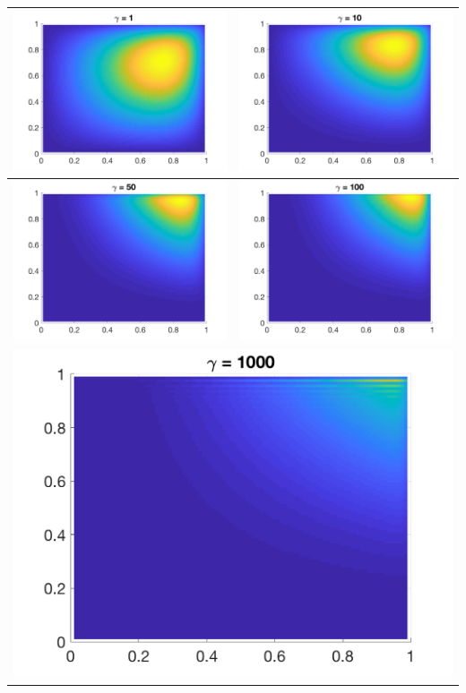 \documentclass[11pt]{article}
\theoremstyle{definition}
\theoremstyle{remark}
\theoremstyle{plain}
\begin{document}
\begin{center}
  \begin{tabular}{|c|c|}
    \hline
    \includegraphics[width=0.45\linewidth]{../Figures/homework5_1_1.png}&\includegraphics[width=0.45\linewidth]{../Figures/homework5_1_10.png}\\\hline
    \includegraphics[width=0.45\linewidth]{../Figures/homework5_1_50.png}&\includegraphics[width=0.45\linewidth]{../Figures/homework5_1_100.png}\\\hline
    \multicolumn{2}{|c|}{\includegraphics[width=0.45\linewidth]{../Figures/homework5_1_1000.png}}\\\hline
  \end{tabular}
\end{center}\newpage
\end{document}
